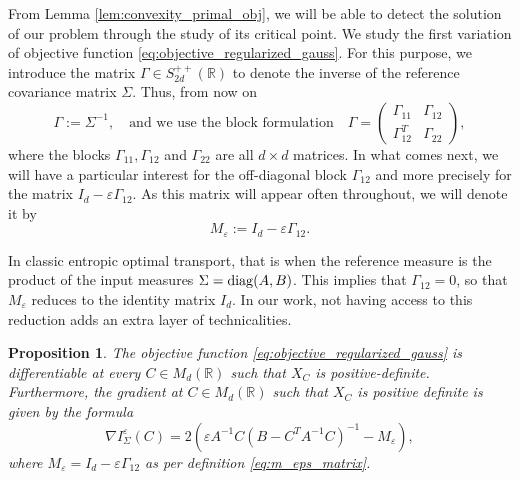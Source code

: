 \documentclass[]{article}
\def\diag{\mathop{\rm diag}\nolimits}
\numberwithin{equation}{section}
\theoremstyle{plain}
\newtheorem{prop}{Proposition}[section]
\begin{document}
From Lemma \ref{lem:convexity_primal_obj}, we will be able to detect the solution of our problem through the study of its critical point. We study the first variation of objective function \eqref{eq:objective_regularized_gauss}. For this purpose, we introduce the matrix $\Gamma \in S_{2d}^{++}(\mathbb{R})$ to denote the inverse of the reference covariance matrix $\Sigma$. Thus, from now on
\begin{equation}\label{eq:inverse_prior}
	\Gamma := \Sigma^{-1}, \quad \text{and we use the block formulation} \quad \Gamma =  \begin{pmatrix}
		\Gamma_{11} & \Gamma_{12} \\
		\Gamma_{12}^T& \Gamma_{22}
	\end{pmatrix},
\end{equation}
where the blocks $\Gamma_{11}, \Gamma_{12}$ and $\Gamma_{22}$ are all $d \times d$ matrices. In what comes next, we will have a particular interest for the off-diagonal block $\Gamma_{12}$ and more precisely for the matrix $I_d - \varepsilon \Gamma_{12}$. As this matrix will appear often throughout, we will denote it by 
\begin{equation}\label{eq:m_eps_matrix}
	M_\varepsilon := I_d - \varepsilon \Gamma_{12}.
\end{equation}  


In classic entropic optimal transport, that is when the reference measure is the product of the input measures $\Sigma = \diag(A, B)$. This implies that $\Gamma_{12} = 0$, so that $M_\varepsilon$ reduces to the identity matrix $I_d$. In our work, not having access to this reduction adds an extra layer of technicalities.


\begin{prop}\label{prop:gradient_primal}
    The objective function \eqref{eq:objective_regularized_gauss} is differentiable at every $C \in M_d(\mathbb{R})$ such that $X_C$ is positive-definite. Furthermore, the gradient at $C \in M_d(\mathbb{R})$ such that $X_C$ is positive definite is given by the formula
    \begin{equation}\label{eq:gradient_primal}
        \nabla I_{\Sigma}^\varepsilon(C) =  2(\varepsilon A^{-1} C (B- C^T A^{-1}C)^{-1}- M_\varepsilon),
    \end{equation}
    where $M_{\varepsilon}=I_d - \varepsilon \Gamma_{12}$ as per definition \eqref{eq:m_eps_matrix}.
\end{prop}
\end{document}
